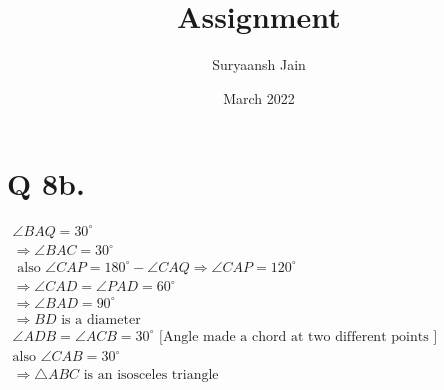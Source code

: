 \documentclass{article}
\title{Assignment}
\author{Suryaansh Jain}
\date{March 2022}
\begin{document}
\maketitle

\section*{Q 8b.}

$
\begin{array}{l}
\angle B A Q=30^{\circ}\\
\Rightarrow \angle B A C=30^{\circ}\\
\text { also\  } \angle C A P=180^{\circ}-\angle C A Q \Rightarrow \angle C A P=120^{\circ}\\
\Rightarrow \angle C A D=\angle P A D=60^{\circ}\\
\Rightarrow \angle B A D=90^{\circ}\\
\Rightarrow B D \text {\ is\ a\ diameter }\\
\angle A D B=\angle A C B=30^{\circ} \text {\ [Angle\ made\ a\ chord\ at\ two\ different\ points\ ]}\\
\text {also\ } \angle C A B=30^{\circ}\\
\Rightarrow \triangle A B C \text {\ is\ an\ isosceles \ triangle }
\end{array}
$
\end{document}
